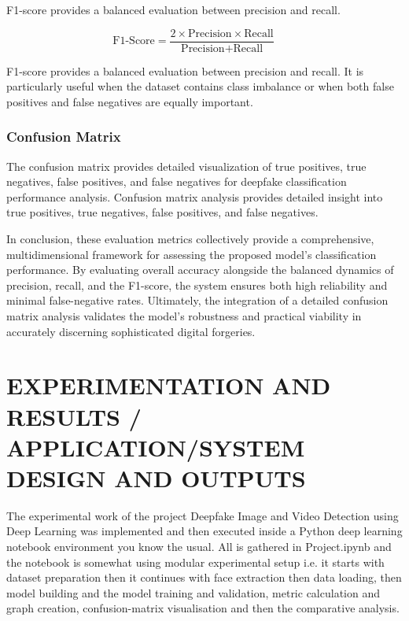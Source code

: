 \documentclass[12pt,a4paper]{report}
\begin{document}
F1-score provides a balanced evaluation between precision and recall.

\[
\text{F1-Score} = \frac{2 \times \text{Precision} \times \text{Recall}}{\text{Precision} + \text{Recall}}
\qquad
\tag{3.4}
\]

F1-score provides a balanced evaluation between precision and recall. It is particularly useful when the dataset contains class imbalance or when both false positives and false negatives are equally important.

\subsection{Confusion Matrix}

The confusion matrix provides detailed visualization of true positives, true negatives, false positives, and false negatives for deepfake classification performance analysis. Confusion matrix analysis provides detailed insight into true positives, true negatives, false positives, and false negatives.

In conclusion, these evaluation metrics collectively provide a comprehensive, multidimensional framework for assessing the proposed model's classification performance. By evaluating overall accuracy alongside the balanced dynamics of precision, recall, and the F1-score, the system ensures both high reliability and minimal false-negative rates. Ultimately, the integration of a detailed confusion matrix analysis validates the model’s robustness and practical viability in accurately discerning sophisticated digital forgeries.

\chapter{EXPERIMENTATION AND RESULTS / APPLICATION/SYSTEM DESIGN AND OUTPUTS }
The experimental work of the project Deepfake Image and Video Detection using Deep Learning was implemented and then executed inside a Python deep learning notebook environment you know the usual. All is gathered in Project.ipynb and the notebook is somewhat using modular experimental setup i.e. it starts with dataset preparation then it continues with face extraction then data loading, then model building and the model training and validation, metric calculation and graph creation, confusion-matrix visualisation and then the comparative analysis. 
\end{document}
